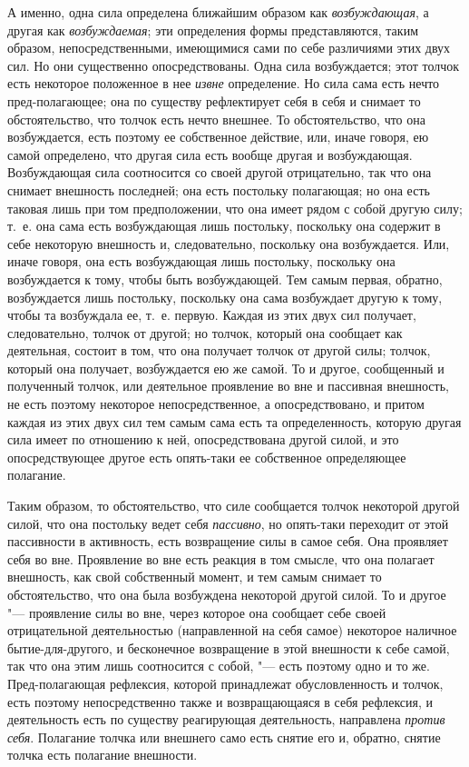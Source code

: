 А именно, одна сила определена ближайшим образом как
{\em возбуждающая}, а другая как
{\em возбуждаемая}; эти определения формы
представляются, таким образом, непосредственными, имеющимися сами по себе
различиями этих двух сил. Но они существенно опосредствованы. Одна сила
возбуждается; этот толчок есть некоторое положенное в нее
{\em извне} определение. Но сила сама есть нечто
пред-полагающее; она по существу рефлектирует себя в себя и снимает то
обстоятельство, что толчок есть нечто внешнее. То обстоятельство, что она
возбуждается, есть поэтому ее собственное действие, или, иначе говоря, ею
самой определено, что другая сила есть вообще другая и возбуждающая.
Возбуждающая сила соотносится со своей другой отрицательно, так что она
снимает внешность последней; она есть постольку полагающая; но она есть
таковая лишь при том предположении, что она имеет рядом с собой другую
силу; т.~е. она сама есть возбуждающая лишь постольку, поскольку она
содержит в себе некоторую внешность и, следовательно, поскольку она
возбуждается. Или, иначе говоря, она есть возбуждающая лишь постольку,
поскольку она возбуждается к тому, чтобы быть возбуждающей. Тем самым
первая, обратно, возбуждается лишь постольку, поскольку она сама возбуждает
другую к тому, чтобы та возбуждала ее, т.~е. первую. Каждая из этих двух
сил получает, следовательно, толчок от другой; но толчок, который она
сообщает как деятельная, состоит в том, что она получает толчок от другой
силы; толчок, который она получает, возбуждается ею же самой. То и другое,
сообщенный и полученный толчок, или деятельное проявление во вне и
пассивная внешность, не есть поэтому некоторое непосредственное, а
опосредствовано, и притом каждая из этих двух сил тем самым сама есть та
определенность, которую другая сила имеет по отношению к ней,
опосредствована другой силой, и это опосредствующее другое есть опять-таки
ее собственное определяющее полагание.

Таким образом, то обстоятельство, что силе сообщается толчок некоторой
другой силой, что она постольку ведет себя
{\em пассивно}, но опять-таки переходит от этой
пассивности в активность, есть возвращение силы в самое себя. Она проявляет
себя во вне. Проявление во вне есть реакция в том смысле, что она полагает
внешность, как свой собственный момент, и тем самым снимает то
обстоятельство, что она была возбуждена некоторой другой силой. То и другое
"--- проявление силы во вне, через которое она сообщает себе своей
отрицательной деятельностью (направленной на себя самое) некоторое наличное
бытие-для-другого, и бесконечное возвращение в этой внешности к себе самой,
так что она этим лишь соотносится с собой, "--- есть поэтому одно и то же.
Пред-полагающая рефлексия, которой принадлежат обусловленность и толчок,
есть поэтому непосредственно также и возвращающаяся в себя рефлексия, и
деятельность есть по существу реагирующая деятельность, направлена
{\em против себя}. Полагание толчка или внешнего само
есть снятие его и, обратно, снятие толчка есть полагание внешности.



